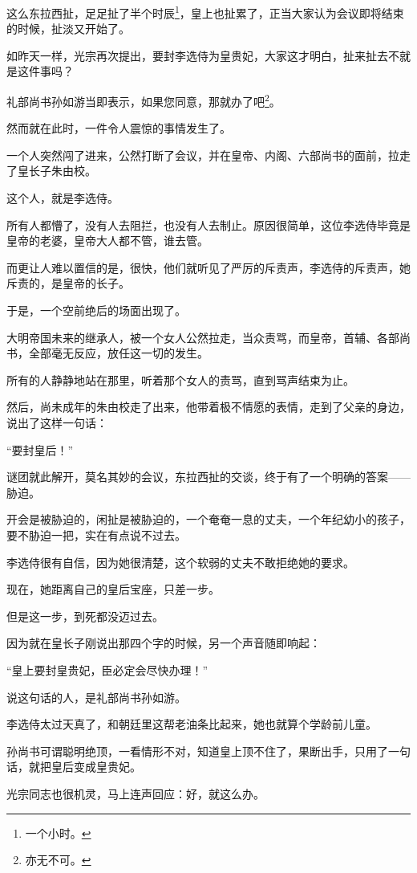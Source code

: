 \begin{multicols}{\theparacolNo}
		这么东拉西扯，足足扯了半个时辰\footnote{一个小时。}，皇上也扯累了，正当大家认为会议即将结束的时候，扯淡又开始了。

		如昨天一样，光宗再次提出，要封李选侍为皇贵妃，大家这才明白，扯来扯去不就是这件事吗？

		礼部尚书孙如游当即表示，如果您同意，那就办了吧\footnote{亦无不可。}。

		然而就在此时，一件令人震惊的事情发生了。

		一个人突然闯了进来，公然打断了会议，并在皇帝、内阁、六部尚书的面前，拉走了皇长子朱由校。

		这个人，就是李选侍。

		所有人都懵了，没有人去阻拦，也没有人去制止。原因很简单，这位李选侍毕竟是皇帝的老婆，皇帝大人都不管，谁去管。

		而更让人难以置信的是，很快，他们就听见了严厉的斥责声，李选侍的斥责声，她斥责的，是皇帝的长子。

		于是，一个空前绝后的场面出现了。

		大明帝国未来的继承人，被一个女人公然拉走，当众责骂，而皇帝，首辅、各部尚书，全部毫无反应，放任这一切的发生。

		所有的人静静地站在那里，听着那个女人的责骂，直到骂声结束为止。

		然后，尚未成年的朱由校走了出来，他带着极不情愿的表情，走到了父亲的身边，说出了这样一句话：

		“要封皇后！”

		谜团就此解开，莫名其妙的会议，东拉西扯的交谈，终于有了一个明确的答案——胁迫。

		开会是被胁迫的，闲扯是被胁迫的，一个奄奄一息的丈夫，一个年纪幼小的孩子，要不胁迫一把，实在有点说不过去。

		李选侍很有自信，因为她很清楚，这个软弱的丈夫不敢拒绝她的要求。

		现在，她距离自己的皇后宝座，只差一步。

		但是这一步，到死都没迈过去。

		因为就在皇长子刚说出那四个字的时候，另一个声音随即响起：

		“皇上要封皇贵妃，臣必定会尽快办理！”

		说这句话的人，是礼部尚书孙如游。

		李选侍太过天真了，和朝廷里这帮老油条比起来，她也就算个学龄前儿童。

		孙尚书可谓聪明绝顶，一看情形不对，知道皇上顶不住了，果断出手，只用了一句话，就把皇后变成皇贵妃。

		光宗同志也很机灵，马上连声回应：好，就这么办。


\end{multicols}
